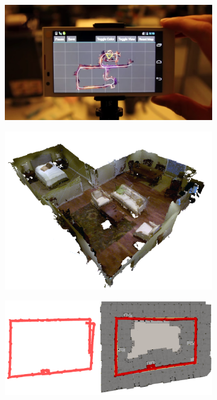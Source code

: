 \documentclass[conference]{IEEEtran}
\begin{document}
\maketitle
\begin{figure}
  \centering
    	 \begin{subfigure}{0.3\linewidth} \centering
		 \includegraphics[width=1\textwidth]{img/mapdevice}
		 \caption{}
		 \label{fig:map_device}
	 \end{subfigure}
      	 \begin{subfigure}{0.3\linewidth} \centering
		 \includegraphics[width=1\textwidth]{img/apartment_scene_color.png}
		 \caption{}
		 \label{fig:apartment_color}
	 \end{subfigure}
	 \begin{subfigure}{0.35\linewidth}\centering
	 \includegraphics[width=1\textwidth]{img/corridor_composite.png}

\end{subfigure}
\end{figure}
\end{document}
